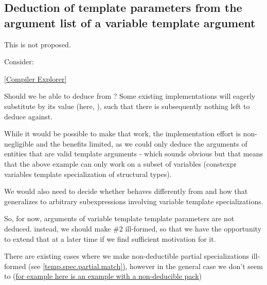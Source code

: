 \documentclass{wg21}
\begin{document}
\subsection{Deduction of template parameters from the argument list of a variable template argument}

This is not proposed.

Consider:


\href{https://godbolt.org/z/sqTfEojh4}{[Compiler Explorer]}


Should we be able to deduce  from ?
Some existing implementations will eagerly substitute  by its value (here, ),
such that there is subsequently nothing left to deduce  against.

While it would be possible to make that work, the implementation effort is non-negligible and the benefits limited,
as we could only deduce the arguments of entities that are valid template arguments - which sounds obvious but that means that the
above example can only work on a subset of variables (constexpr variables template specialization of structural types).

We would also need to decide whether  behaves differently from 
and how that generalizes to arbitrary subexpressions involving variable template specializations.

So, for now, arguments of variable template template parameters are not deduced.
instead, we should make \#2 ill-formed, so that we have the opportunity to extend that at a later time if we find sufficient motivation for it.

There are existing cases where we make non-deductible partial specializations ill-formed (see \href{https://eel.is/c++draft/temp.spec.partial#match-3}{[temp.spec.partial.match])},
however in the general case we don't seem to (\href{https://gcc.godbolt.org/z/fv1e8nnsf}{for example here is an example with a non-deducible pack})
\end{document}
